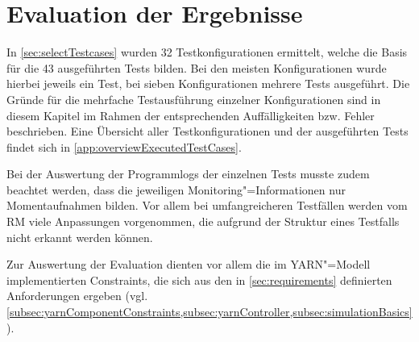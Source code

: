 \chapter{Evaluation der Ergebnisse}
\label{ch:evaluationResults}

In \cref{sec:selectTestcases} wurden 32 Testkonfigurationen ermittelt, welche die Basis für die 43 ausgeführten Tests bilden.
Bei den meisten Konfigurationen wurde hierbei jeweils ein Test, bei sieben Konfigurationen mehrere Tests ausgeführt.
Die Gründe für die mehrfache Testausführung einzelner Konfigurationen sind in diesem Kapitel im Rahmen der entsprechenden Auffälligkeiten bzw. Fehler beschrieben.
Eine Übersicht aller Testkonfigurationen und der ausgeführten Tests findet sich in \cref{app:overviewExecutedTestCases}.

Bei der Auswertung der Programmlogs der einzelnen Tests musste zudem beachtet werden, dass die jeweiligen Monitoring"=Informationen nur Momentaufnahmen bilden.
Vor allem bei umfangreicheren Testfällen werden vom \gls{RM} viele Anpassungen vorgenommen, die aufgrund der Struktur eines Testfalls nicht erkannt werden können.

Zur Auswertung der Evaluation dienten vor allem die im YARN"=Modell implementierten Constraints, die sich aus den in \cref{sec:requirements} definierten Anforderungen ergeben (vgl. \cref{subsec:yarnComponentConstraints,subsec:yarnController,subsec:simulationBasics}).
















